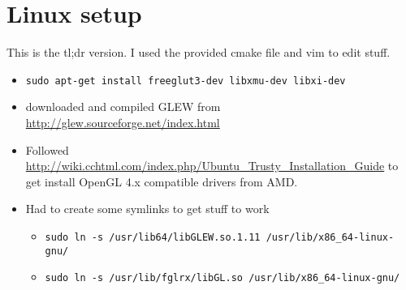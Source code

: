 \section{Linux setup}
This is the tl;dr version. I used the provided cmake file and vim to edit stuff.

\begin{itemize}
    \item \texttt{sudo apt-get install freeglut3-dev libxmu-dev libxi-dev}
    \item downloaded and compiled GLEW from \url{http://glew.sourceforge.net/index.html}
    \item Followed \url{http://wiki.cchtml.com/index.php/Ubuntu_Trusty_Installation_Guide} to get install OpenGL 4.x compatible drivers from AMD.
    \item Had to create some symlinks to get stuff to work
    \begin{itemize}
        \item \texttt{sudo ln -s /usr/lib64/libGLEW.so.1.11 /usr/lib/x86\_64-linux-gnu/}
        \item \texttt{sudo ln -s /usr/lib/fglrx/libGL.so /usr/lib/x86\_64-linux-gnu/}
    \end{itemize}
\end{itemize}

